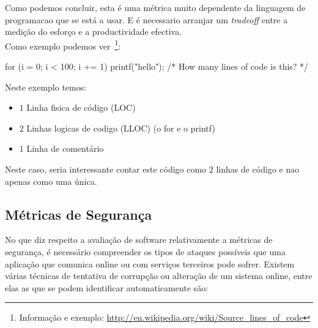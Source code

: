 Como podemos concluir, esta é uma métrica muito dependente da linguagem de programacao que se está a usar. E é necessario arranjar um 
\emph{tradeoff} entre a medição do esforço e a productividade efectiva.\\

Como exemplo podemos ver~\footnote{Informação e exemplo: \url{http://en.wikipedia.org/wiki/Source_lines_of_code}}:

\begin{code_files}
for (i = 0; i < 100; i += 1) printf("hello"); /* How many lines of code is this? */
\end{code_files}

Neste exemplo temos:

\begin{itemize}
\item $1$ Linha fisica de código (LOC)
\item $2$ Linhas logicas de codigo (LLOC) (o for e o printf)
\item $1$ Linha de comentário
\end{itemize}

Neste caso, seria interessante contar este código como $2$ linhas de código e nao apenas como uma única.

\subsection{Métricas de Segurança}

No que diz respeito a avaliação de software relativamente a métricas de segurança, é necessário compreender os tipos de ataques possíveis que uma 
aplicação que comunica online ou com serviços terceiros pode sofrer. Existem várias técnicas de tentativa de corrupção ou alteração de um sistema online, 
entre elas as que se podem identificar automaticamente são:

